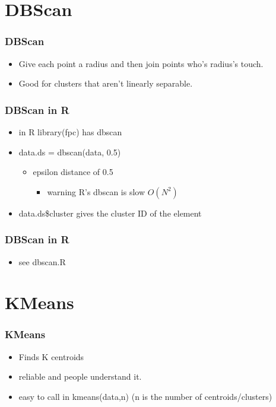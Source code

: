 \documentclass[bigger]{beamer}
\begin{document}
\section{DBScan}
\label{sec-2}
\begin{frame}
\frametitle{DBScan}
\label{sec-2-1}


\begin{itemize}
\item Give each point a radius and then join points who's radius's
     touch.
\item Good for clusters that aren't linearly separable.
\end{itemize}
\end{frame}
\begin{frame}
\frametitle{DBScan in R}
\label{sec-2-2}


\begin{itemize}
\item in R library(fpc) has dbscan
\item data.ds = dbscan(data, 0.5)
\begin{itemize}
\item epsilon distance of 0.5
\begin{itemize}
\item warning R's dbscan is slow $O(N^2)$
\end{itemize}
\end{itemize}
\item data.ds\$cluster gives the cluster ID of the element
\end{itemize}
\end{frame}
\begin{frame}
\frametitle{DBScan in R}
\label{sec-2-3}


\begin{itemize}
\item see dbscan.R
\end{itemize}
\end{frame}
\section{KMeans}
\label{sec-3}
\begin{frame}
\frametitle{KMeans}
\label{sec-3-1}


\begin{itemize}
\item Finds K centroids
\item reliable and people understand it.
\item easy to call in kmeans(data,n) (n is the number of centroids/clusters)
\end{itemize}
\end{frame}
\end{document}

